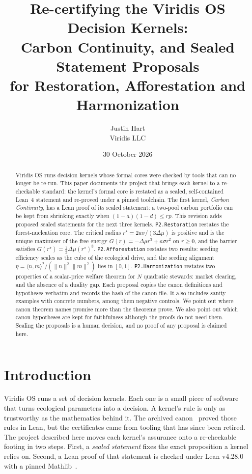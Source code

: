 \documentclass[11pt]{article}
\title{Re-certifying the Viridis OS Decision Kernels:\\ Carbon Continuity, and Sealed Statement Proposals\\ for Restoration, Afforestation and Harmonization}
\author{Justin Hart\\ Viridis LLC}
\date{30 October 2026}
\theoremstyle{definition}
\theoremstyle{remark}
\begin{document}
\maketitle

\begin{abstract}
Viridis OS runs decision kernels whose formal cores were checked by tools that can no longer be re-run.
This paper documents the project that brings each kernel to a re-checkable standard: the kernel's formal core is restated as a
sealed, self-contained Lean~4 statement and re-proved under a pinned toolchain.
The first kernel, \emph{Carbon Continuity}, has a Lean proof of its sealed statement: a two-pool carbon portfolio can be kept
from shrinking exactly when $(1-a)(1-d)\le rp$.
This revision adds proposed sealed statements for the next three kernels.
\texttt{P2.Restoration} restates the forest-nucleation core.
The critical radius $r^\star=2a\sigma/(3\Delta\mu)$ is positive and is the unique maximiser of the free energy
$G(r)=-\Delta\mu r^3+a\sigma r^2$ on $r\ge 0$, and the barrier satisfies $G(r^\star)=\tfrac12\Delta\mu (r^\star)^3$.
\texttt{P2.Afforestation} restates two results: seeding efficiency scales as the cube of the ecological drive, and the seeding
alignment $\eta=\langle n,m\rangle^2/(\|n\|^2\|m\|^2)$ lies in $[0,1]$.
\texttt{P2.Harmonization} restates two properties of a scalar-price welfare theorem for $N$ quadratic stewards: market clearing,
and the absence of a duality gap.
Each proposal copies the canon definitions and hypotheses verbatim and records the hash of the canon file.
It also includes sanity examples with concrete numbers, among them negative controls.
We point out where canon theorem names promise more than the theorems prove.
We also point out which canon hypotheses are kept for faithfulness although the proofs do not need them.
Sealing the proposals is a human decision, and no proof of any proposal is claimed here.
\end{abstract}

\section{Introduction}
Viridis OS runs a set of decision kernels. Each one is a small piece of software that turns ecological
parameters into a decision. A kernel's rule is only as trustworthy as the mathematics behind it.
The archived canon~\cite{HartCanon2026} proved those rules in Lean, but the certificates came from tooling that has
since been retired. The project described here moves each kernel's assurance onto a re-checkable footing in two steps.
First, a \emph{sealed statement} fixes the exact proposition a kernel relies on.
Second, a Lean proof of that statement is checked under Lean v4.28.0 with a pinned Mathlib~\cite{Mathlib2020}.
\end{document}
